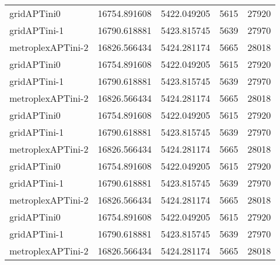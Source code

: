 \begin{table}[h]
\begin{longtable}{lrrrr}
gridAPTini0 & 16754.891608 & 5422.049205 & 5615 & 27920 \\
gridAPTini-1 & 16790.618881 & 5423.815745 & 5639 & 27970 \\
metroplexAPTini-2 & 16826.566434 & 5424.281174 & 5665 & 28018 \\
gridAPTini0 & 16754.891608 & 5422.049205 & 5615 & 27920 \\
gridAPTini-1 & 16790.618881 & 5423.815745 & 5639 & 27970 \\
metroplexAPTini-2 & 16826.566434 & 5424.281174 & 5665 & 28018 \\
gridAPTini0 & 16754.891608 & 5422.049205 & 5615 & 27920 \\
gridAPTini-1 & 16790.618881 & 5423.815745 & 5639 & 27970 \\
metroplexAPTini-2 & 16826.566434 & 5424.281174 & 5665 & 28018 \\
gridAPTini0 & 16754.891608 & 5422.049205 & 5615 & 27920 \\
gridAPTini-1 & 16790.618881 & 5423.815745 & 5639 & 27970 \\
metroplexAPTini-2 & 16826.566434 & 5424.281174 & 5665 & 28018 \\
gridAPTini0 & 16754.891608 & 5422.049205 & 5615 & 27920 \\
gridAPTini-1 & 16790.618881 & 5423.815745 & 5639 & 27970 \\
metroplexAPTini-2 & 16826.566434 & 5424.281174 & 5665 & 28018 \\
\end{longtable}
\end{table}

